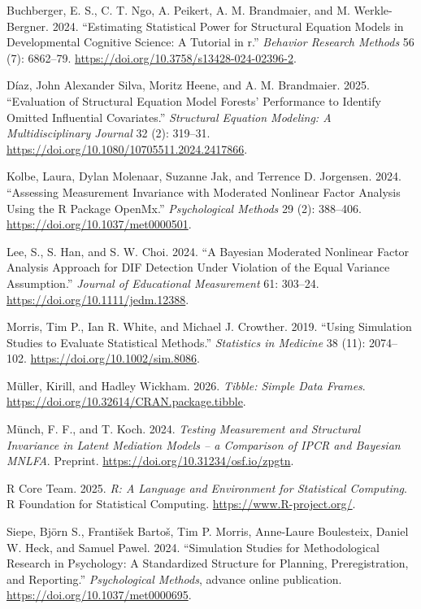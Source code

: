\documentclass[
  man,
  floatsintext]{apa7}
\newlength{\cslhangindent}
\newenvironment{CSLReferences}[2] %
 {\begin{list}{}{%
  \setlength{\itemindent}{0pt}
  \setlength{\leftmargin}{0pt}
  \setlength{\parsep}{0pt}
  \ifodd #1
   \setlength{\leftmargin}{\cslhangindent}
   \setlength{\itemindent}{-1\cslhangindent}
  \fi
  \setlength{\itemsep}{#2\baselineskip}}}
 {\end{list}}
\begin{document}
\begin{CSLReferences}{1}{1}
Buchberger, E. S., C. T. Ngo, A. Peikert, A. M. Brandmaier, and M.
Werkle-Bergner. 2024. {``Estimating Statistical Power for Structural
Equation Models in Developmental Cognitive Science: A Tutorial in r.''}
\emph{Behavior Research Methods} 56 (7): 6862--79.
\url{https://doi.org/10.3758/s13428-024-02396-2}.

Díaz, John Alexander Silva, Moritz Heene, and A. M. Brandmaier. 2025.
{``Evaluation of Structural Equation Model Forests' Performance to
Identify Omitted Influential Covariates.''} \emph{Structural Equation
Modeling: A Multidisciplinary Journal} 32 (2): 319--31.
\url{https://doi.org/10.1080/10705511.2024.2417866}.

Kolbe, Laura, Dylan Molenaar, Suzanne Jak, and Terrence D. Jorgensen.
2024. {``{Assessing Measurement Invariance with Moderated Nonlinear
Factor Analysis Using the R Package OpenMx}.''} \emph{Psychological
Methods} 29 (2): 388--406. \url{https://doi.org/10.1037/met0000501}.

Lee, S., S. Han, and S. W. Choi. 2024. {``A Bayesian Moderated Nonlinear
Factor Analysis Approach for DIF Detection Under Violation of the Equal
Variance Assumption.''} \emph{Journal of Educational Measurement} 61:
303--24. \url{https://doi.org/10.1111/jedm.12388}.

Morris, Tim P., Ian R. White, and Michael J. Crowther. 2019. {``Using
Simulation Studies to Evaluate Statistical Methods.''} \emph{Statistics
in Medicine} 38 (11): 2074--102. \url{https://doi.org/10.1002/sim.8086}.

Müller, Kirill, and Hadley Wickham. 2026. \emph{Tibble: Simple Data
Frames}. \url{https://doi.org/10.32614/CRAN.package.tibble}.

Münch, F. F., and T. Koch. 2024. \emph{Testing Measurement and
Structural Invariance in Latent Mediation Models -- a Comparison of IPCR
and Bayesian MNLFA}. Preprint.
\url{https://doi.org/10.31234/osf.io/zpgtn}.

R Core Team. 2025. \emph{R: A Language and Environment for Statistical
Computing}. R Foundation for Statistical Computing.
\url{https://www.R-project.org/}.

Siepe, Björn S., František Bartoš, Tim P. Morris, Anne-Laure Boulesteix,
Daniel W. Heck, and Samuel Pawel. 2024. {``Simulation Studies for
Methodological Research in Psychology: A Standardized Structure for
Planning, Preregistration, and Reporting.''} \emph{Psychological
Methods}, advance online publication.
\url{https://doi.org/10.1037/met0000695}.


\end{CSLReferences}
\end{document}
